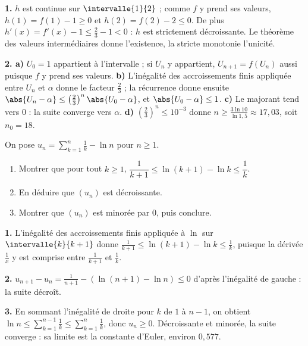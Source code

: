 \begin{corrige}
\textbf{1.} $h$ est continue sur $\intervalle{1}{2}$ ; comme $f$ y prend ses
valeurs, $h(1) = f(1)-1 \geq 0$ et $h(2) = f(2)-2 \leq 0$. De plus
$h'(x) = f'(x)-1 \leq \frac23-1<0$ : $h$ est strictement décroissante. Le
théorème des valeurs intermédiaires donne l'existence, la stricte monotonie
l'unicité.

\textbf{2. a)} $U_{0} = 1$ appartient à l'intervalle ; si $U_{n}$ y
appartient, $U_{n+1} = f(U_{n})$ aussi puisque $f$ y prend ses valeurs.
\textbf{b)} L'inégalité des accroissements finis appliquée entre $U_{n}$ et
$\alpha$ donne le facteur $\frac23$ ; la récurrence donne ensuite
$\abs{U_{n}-\alpha} \leq \left(\frac23\right)^{n}\abs{U_{0}-\alpha}$, et
$\abs{U_{0}-\alpha} \leq 1$.
\textbf{c)} Le majorant tend vers $0$ : la suite converge vers $\alpha$.
\textbf{d)} $\left(\frac23\right)^{n} \leq 10^{-3}$ donne
$n \geq \frac{3\ln10}{\ln1{,}5} \approx 17{,}03$, soit $n_{0} = 18$.
\end{corrige}

\begin{concours}
On pose $u_{n} = \displaystyle\sum_{k=1}^{n}\frac{1}{k}-\ln n$ pour
$n \geq 1$.

\begin{enumerate}[label=\textbf{\arabic*.}, leftmargin=*, itemsep=0.25em]
  \item Montrer que pour tout $k \geq 1$,
        $\dfrac{1}{k+1} \leq \ln(k+1)-\ln k \leq \dfrac{1}{k}$.
  \item En déduire que $(u_{n})$ est décroissante.
  \item Montrer que $(u_{n})$ est minorée par $0$, puis conclure.
\end{enumerate}
\end{concours}

\begin{corrige}
\textbf{1.} L'inégalité des accroissements finis appliquée à $\ln$ sur
$\intervalle{k}{k+1}$ donne
$\frac{1}{k+1} \leq \ln(k+1)-\ln k \leq \frac1k$, puisque la dérivée
$\frac1x$ y est comprise entre $\frac{1}{k+1}$ et $\frac1k$.

\textbf{2.} $u_{n+1}-u_{n} = \frac{1}{n+1}-\left(\ln(n+1)-\ln n\right)
\leq 0$ d'après l'inégalité de gauche : la suite décroît.

\textbf{3.} En sommant l'inégalité de droite pour $k$ de $1$ à $n-1$, on
obtient $\ln n \leq \sum_{k=1}^{n-1}\frac1k \leq \sum_{k=1}^{n}\frac1k$, donc
$u_{n} \geq 0$. Décroissante et minorée, la suite converge : sa limite est la
constante d'Euler, environ $0{,}577$.
\end{corrige}

